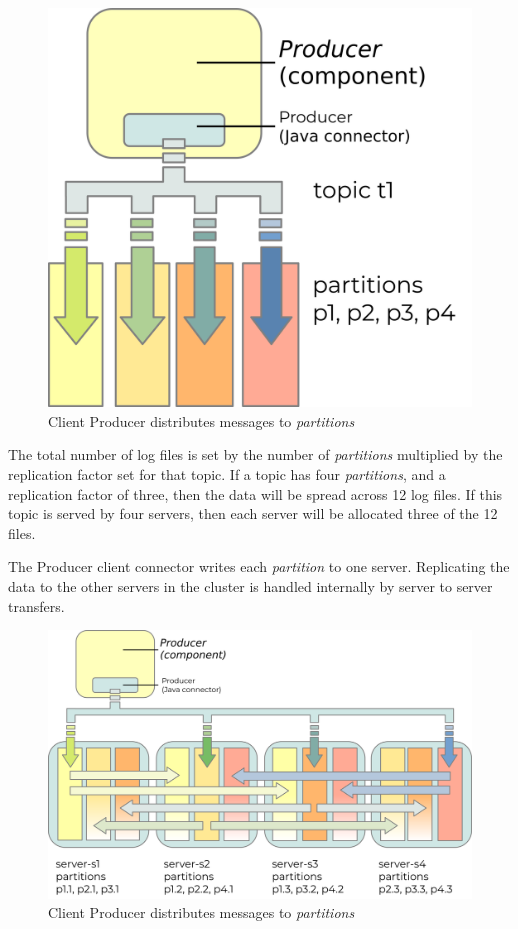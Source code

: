 \documentclass{article}
\newcommand{\kfpartition} {\textit{partition}\xspace}
\newcommand{\kfpartitions} {\textit{partitions}\xspace}
\newcommand{\javaname}[1] {{\ttfamily\color{codeblue} #1}}
\begin{document}
\begin{figure}[hbt!]
\centering
\includegraphics{images/kafka-partitions-01.png}
%
\caption{Client \javaname{Producer} distributes messages to \kfpartitions}
\label{fig:kafka-partitions-01}
\end{figure}

The total number of log files is set by the number of \kfpartitions multiplied by the replication factor set for that topic.
If a topic has four \kfpartitions, and a replication factor of three, then the data will be spread across 12 log files.
If this topic is served by four servers, then each server will be allocated three of the 12 files.

The \javaname{Producer} client connector writes each \kfpartition to one server. Replicating the data to the other servers in the cluster is handled internally by server to server transfers.

\begin{figure}[hbt!]
\centering
\includegraphics{images/kafka-partitions-03.png}
%
\caption{Client \javaname{Producer} distributes messages to \kfpartitions}
\label{fig:kafka-partitions-03}
\end{figure}
\end{document}
